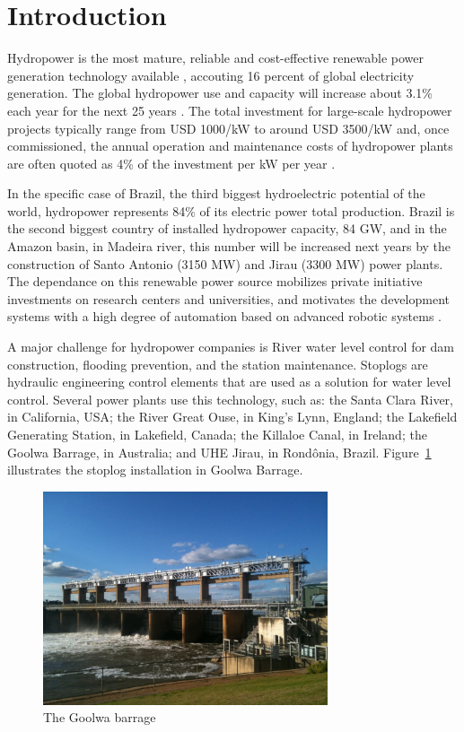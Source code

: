 \section{Introduction}
Hydropower is the most mature, reliable and cost-effective
renewable power generation technology available \citep{brown}, accouting 16
percent of global electricity generation. The global hydropower use and
capacity will increase about 3.1\% each year for the next 25 years \citep{wi}.
The total investment for large-scale hydropower projects
typically range from USD 1000/kW to around USD 3500/kW and, once commissioned,
the annual operation and maintenance costs of hydropower plants are often
quoted as 4\% of the investment per kW per year \citep{ecofys}. 

In the specific case of Brazil, the third biggest hydroelectric potential of
the world, hydropower represents 84\% of its electric power total production.
Brazil is the second biggest country of installed hydropower capacity, 84 GW,
and in the Amazon basin, in Madeira river, this number will be increased next
years by the construction of Santo Antonio (3150 MW) and Jirau (3300 MW) power
plants. The dependance on this renewable power source mobilizes private
initiative investments on research centers and universities, and motivates the
development systems with a high degree of automation based on advanced robotic
systems \citep{aneel}.

A major challenge for hydropower companies is River water level
control for dam construction, flooding prevention, and the station
maintenance. Stoplogs are hydraulic engineering control elements that are used
as a solution for water level control. Several power plants use this technology, such as:
the Santa Clara River, in California, USA; the River Great Ouse, in King's Lynn, England; the
Lakefield Generating Station, in Lakefield, Canada; the Killaloe Canal, in
Ireland; the Goolwa Barrage, in Australia; and UHE Jirau, in Rond{\^o}nia,
Brazil. Figure~\ref{figs:intro:goolwa} illustrates the stoplog installation in
Goolwa Barrage.

\begin{figure}[ht]
\centering
\includegraphics[width=8.4cm]{figs/intro/goolwa.jpg}
\caption{The Goolwa barrage}
\label{figs:intro:goolwa}
\end{figure}

